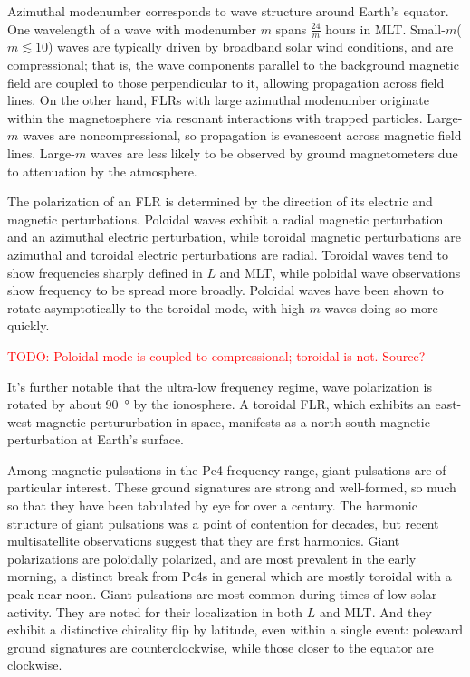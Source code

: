 \documentclass{article}
\newcommand{\todo}[1]{ \textcolor{red}{TODO: #1} }
\newcommand{\azm}{\ensuremath{m}\xspace}
\begin{document}
Azimuthal modenumber corresponds to wave structure around Earth's equator. One wavelength of a wave with modenumber \azm spans $\frac{24}{\azm}$ hours in MLT. Small-\azm ($\azm \lesssim 10$) waves are typically driven by broadband solar wind conditions\cite{degeling_2014,hao_2014,zong_2009,chen_1974,liu_2011,southwood_1974}, and are compressional; that is, the wave components parallel to the background magnetic field are coupled to those perpendicular to it, allowing propagation across field lines. On the other hand, FLRs with large azimuthal modenumber originate within the magnetosphere via resonant interactions with trapped particles. Large-\azm waves are noncompressional, so propagation is evanescent across magnetic field lines\cite{cummings_1969,radoski_1974}. Large-\azm waves are less likely to be observed by ground magnetometers due to attenuation by the atmosphere\cite{hughes_1976,wright_1999,yeoman_2001}.

The polarization of an FLR is determined by the direction of its electric and magnetic perturbations. Poloidal waves exhibit a radial magnetic perturbation and an azimuthal electric perturbation, while toroidal magnetic perturbations are azimuthal and toroidal electric perturbations are radial. Toroidal waves tend to show frequencies sharply defined in $L$ and MLT, while poloidal wave observations show frequency to be spread more broadly\cite{engebretson_1986}. Poloidal waves have been shown to rotate asymptotically to the toroidal mode, with high-\azm waves doing so more quickly\cite{mann_1995,mann_1997,radoski_1974}.

\todo{Poloidal mode is coupled to compressional; toroidal is not. Source?}

It's further notable that the ultra-low frequency regime, wave polarization is rotated by about \SI{90}{\degree} by the ionosphere\cite{nishida_1964_screening}. A toroidal FLR, which exhibits an east-west magnetic pertururbation in space, manifests as a north-south magnetic perturbation at Earth's surface.

Among magnetic pulsations in the Pc4 frequency range, giant pulsations are of particular interest. These ground signatures are strong and well-formed, so much so that they have been tabulated by eye for over a century\cite{birkeland_1901}. The harmonic structure of giant pulsations was a point of contention for decades, but recent multisatellite observations suggest that they are first harmonics\cite{glassmeier_1999,hillebrand_1982,kokubun_1989,takahashi_2011}. Giant polarizations are poloidally polarized, and are most prevalent in the early morning\cite{chisham_1991,glassmeier_1980,rostoker_1979}, a distinct break from Pc4s in general which are mostly toroidal with a peak near noon\cite{anderson_1990}. Giant pulsations are most common during times of low solar activity\cite{brekke_1987}. They are noted for their localization in both $L$ and MLT\cite{anderson_1990}. And they exhibit a distinctive chirality flip by latitude, even within a single event: poleward ground signatures are counterclockwise, while those closer to the equator are clockwise\cite{eleman_1967}.
\end{document}

